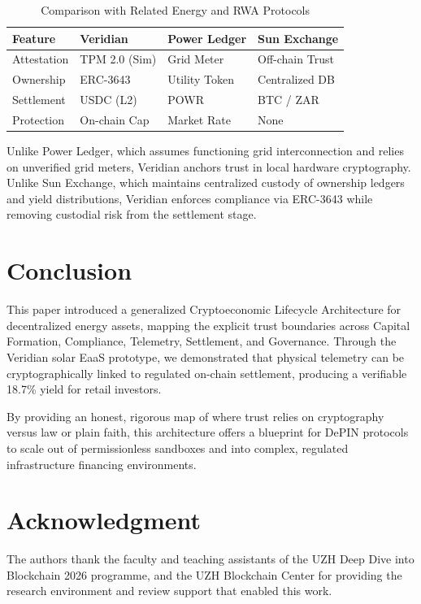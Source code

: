 \documentclass[conference]{IEEEtran}
\begin{document}
\begin{table}[h]
\caption{Comparison with Related Energy and RWA Protocols}
\label{tab:comparison}
\renewcommand{\arraystretch}{1.2}
\begin{tabular}{p{1.6cm}p{1.7cm}p{1.6cm}p{2.1cm}}
\toprule
\textbf{Feature} & \textbf{Veridian} & \textbf{Power Ledger} & \textbf{Sun Exchange} \\
\midrule
Attestation & TPM 2.0 (Sim) & Grid Meter & Off-chain Trust \\
Ownership & ERC-3643 & Utility Token & Centralized DB \\
Settlement & USDC (L2) & POWR & BTC / ZAR \\
Protection & On-chain Cap & Market Rate & None \\
\bottomrule
\end{tabular}
\end{table}

Unlike Power Ledger, which assumes functioning grid interconnection and relies on unverified grid meters, Veridian anchors trust in local hardware cryptography. Unlike Sun Exchange, which maintains centralized custody of ownership ledgers and yield distributions, Veridian enforces compliance via ERC-3643 while removing custodial risk from the settlement stage.

\section{Conclusion}
\label{sec:conclusion}

This paper introduced a generalized Cryptoeconomic Lifecycle Architecture for decentralized energy assets, mapping the explicit trust boundaries across Capital Formation, Compliance, Telemetry, Settlement, and Governance. Through the Veridian solar EaaS prototype, we demonstrated that physical telemetry can be cryptographically linked to regulated on-chain settlement, producing a verifiable 18.7\% yield for retail investors. 

By providing an honest, rigorous map of where trust relies on cryptography versus law or plain faith, this architecture offers a blueprint for DePIN protocols to scale out of permissionless sandboxes and into complex, regulated infrastructure financing environments.

\section*{Acknowledgment}

The authors thank the faculty and teaching assistants of the UZH Deep Dive into Blockchain 2026 programme, and the UZH Blockchain Center for providing the research environment and review support that enabled this work.



\end{document}
